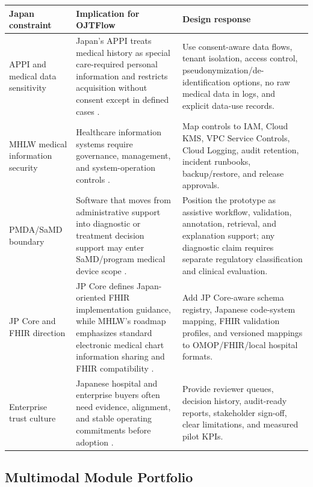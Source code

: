 \begin{longtable}{p{}p{}p{}}
\toprule
\textbf{Japan constraint} & \textbf{Implication for OJTFlow} & \textbf{Design response} \\
\midrule
APPI and medical data sensitivity & Japan's APPI treats medical history as special care-required personal information and restricts acquisition without consent except in defined cases \cite{japanAPPI}. & Use consent-aware data flows, tenant isolation, access control, pseudonymization/de-identification options, no raw medical data in logs, and explicit data-use records. \\
\addlinespace
MHLW medical information security & Healthcare information systems require governance, management, and system-operation controls \cite{mhlwMedicalInfoSecurity}. & Map controls to IAM, Cloud KMS, VPC Service Controls, Cloud Logging, audit retention, incident runbooks, backup/restore, and release approvals. \\
\addlinespace
PMDA/SaMD boundary & Software that moves from administrative support into diagnostic or treatment decision support may enter SaMD/program medical device scope \cite{pmdaSaMD}. & Position the prototype as assistive workflow, validation, annotation, retrieval, and explanation support; any diagnostic claim requires separate regulatory classification and clinical evaluation. \\
\addlinespace
JP Core and FHIR direction & JP Core defines Japan-oriented FHIR implementation guidance, while MHLW's roadmap emphasizes standard electronic medical chart information sharing and FHIR compatibility \cite{jpCore,mhlwMedicalDXRoadmap}. & Add JP Core-aware schema registry, Japanese code-system mapping, FHIR validation profiles, and versioned mappings to OMOP/FHIR/local hospital formats. \\
\addlinespace
Enterprise trust culture & Japanese hospital and enterprise buyers often need evidence, alignment, and stable operating commitments before adoption \cite{japanBusinessCulture}. & Provide reviewer queues, decision history, audit-ready reports, stakeholder sign-off, clear limitations, and measured pilot KPIs. \\
\bottomrule
\end{longtable}

\subsection{Multimodal Module Portfolio}


